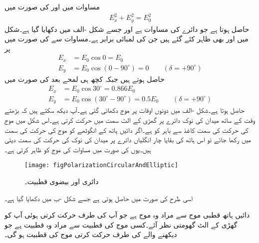 مساوات  میں  اور  کی صورت میں
\begin{align}\label{مساوات_قطبیت_عمومی_دائری_قطبیت}
E_x^2 +E_y^2=E_{0}^2
\end{align}
حاصل ہوتا ہے جو دائرے کی مساوات ہے اور جسے شکل -الف میں دکھایا گیا ہے۔شکل میں  اور  بھی ظاہر کئے گئے ہیں جن کی لمبائی برابر ہے۔مساوات  سے  کی صورت میں  پر 
\begin{align*}
E_x&=E_{0} \cos 0=E_{0}\\  
E_y&=E_{0} \cos (0  -90^\circ) =0  \quad \quad (\delta =+90^\circ)
\end{align*}
حاصل ہوتے ہیں جبکہ کچھ ہی لمحے بعد  کی صورت میں
\begin{align*}
E_x&=E_{0} \cos 30^\circ=0.866 E_{0} \\
E_y&=E_{0} \cos (30^\circ  -90^\circ) =0.5 E_{0} \quad \quad (\delta =+90^\circ)
\end{align*}
حاصل ہوتا ہے۔شکل -الف میں دونوں اوقات پر موج دکھائی گئی ہے۔آپ دیکھ سکتے ہیں کہ بڑھتے وقت کے ساتھ میدان کی نوک دائرے پر گھڑی کے الٹ سمت میں حرکت کرتی ہے۔اس شکل میں موج کی حرکت کی سمت  کاغذ سے باہر کو ہے۔اگر دائیں ہاتھ کے انگوٹھے کو موج کی حرکت کی سمت میں رکھا جائے تو اس ہاتھ کی بقایا چار انگلیاں دائرے پر میدان کی نوک کی حرکت کی سمت دیتی ہیں۔یوں  کی صورت میں مساوات   کی موج کو ظاہر کرتی ہے۔   
\begin{figure}
\centering
\texttt{[image: figPolarizationCircularAndElliptic]}
\caption{دائری اور بیضوی قطبیت۔}
\label{شکل_قطبیت_دائری_اور_بیضوی_قطبیت}
\end{figure}

اسی طرح  کی صورت میں  حاصل ہوتی ہے جسے شکل -ب میں دکھایا گیا ہے۔

دائیں ہاتھ قطبی موج سے مراد وہ موج ہے جو آپ کی طرف حرکت کرتی ہوئی آپ کو گھڑی کے الٹ گھومتی نظر آئے۔کسی موج کی قطبیت سے مراد وہ قطبیت ہے جو دیکھنے والے کی طرف حرکت کرتی موج کی قطبیت ہو گی۔

